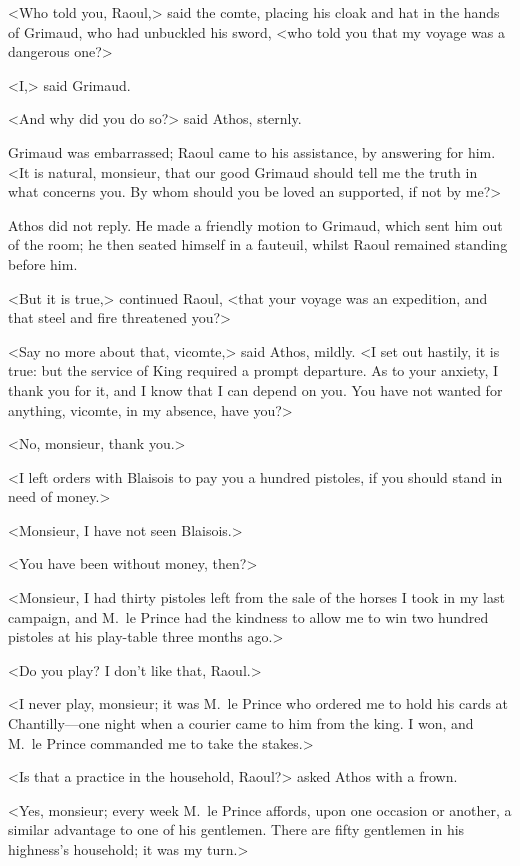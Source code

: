 <Who told you, Raoul,> said the comte, placing his cloak and hat in the hands of Grimaud, who had unbuckled his sword, <who told you that my voyage was a dangerous one?>

<I,> said Grimaud.

<And why did you do so?> said Athos, sternly.

Grimaud was embarrassed; Raoul came to his assistance, by answering for him. <It is natural, monsieur, that our good Grimaud should tell me the truth in what concerns you. By whom should you be loved an supported, if not by me?>

Athos did not reply. He made a friendly motion to Grimaud, which sent him out of the room; he then seated himself in a fauteuil, whilst Raoul remained standing before him.

<But it is true,> continued Raoul, <that your voyage was an expedition, and that steel and fire threatened you?>

<Say no more about that, vicomte,> said Athos, mildly. <I set out hastily, it is true: but the service of King  required a prompt departure. As to your anxiety, I thank you for it, and I know that I can depend on you. You have not wanted for anything, vicomte, in my absence, have you?>

<No, monsieur, thank you.>

<I left orders with Blaisois to pay you a hundred pistoles, if you should stand in need of money.>

<Monsieur, I have not seen Blaisois.>

<You have been without money, then?>

<Monsieur, I had thirty pistoles left from the sale of the horses I took in my last campaign, and M.~le Prince had the kindness to allow me to win two hundred pistoles at his play-table three months ago.>

<Do you play? I don't like that, Raoul.>

<I never play, monsieur; it was M.~le Prince who ordered me to hold his cards at Chantilly—one night when a courier came to him from the king. I won, and M.~le Prince commanded me to take the stakes.>

<Is that a practice in the household, Raoul?> asked Athos with a frown.

<Yes, monsieur; every week M.~le Prince affords, upon one occasion or another, a similar advantage to one of his gentlemen. There are fifty gentlemen in his highness's household; it was my turn.>

